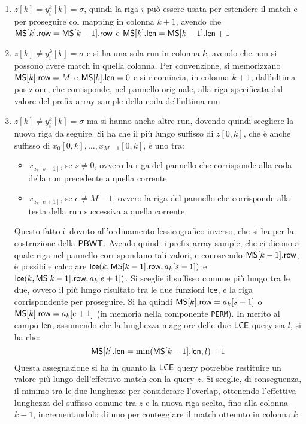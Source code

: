 \begin{enumerate}
  \item $z[k]=y_i^k[k]=\sigma$, quindi la riga $i$ può essere usata per
  estendere il 
  match e per 
  proseguire col mapping in colonna $k+1$, avendo che
  $\mbox{\rm {\sf MS}}[k].\mbox{\rm {\sf row}}=\mbox{\rm {\sf MS}}[k-1].\mbox{\rm {\sf row}}$ e $\mbox{\rm {\sf MS}}[k].\mbox{\rm {\sf len}}=\mbox{\rm {\sf MS}}[k-1].\mbox{\rm {\sf len}}+1$
  \item $z[k]\neq y_i^k[k]=\sigma$ e si ha una sola run in colonna $k$, avendo
  che 
  non si possono avere match in quella colonna. Per convenzione, si
  memorizzano $\mbox{\rm {\sf MS}}[k].\mbox{\rm {\sf row}} = M$ e $\mbox{\rm {\sf MS}}[k].\mbox{\rm {\sf len}}=0$ e si ricomincia, in
  colonna 
  $k+1$, dall'ultima posizione, che corrisponde, nel pannello originale,
  alla riga specificata dal valore del prefix array sample della coda
  dell'ultima run 
  \item $z[k]\neq y_i^k[k]=\sigma$ ma si hanno anche altre run, dovendo quindi
  scegliere 
  la nuova riga da seguire. Si ha che il più lungo suffisso di $z[0,k]$, che è
  anche suffisso di $x_0[0,k],\ldots, x_{M-1}[0,k]$, è uno tra:
  \begin{itemize}
    \item $x_{a_k[s-1]}$, se $s\neq 0$, ovvero la riga del pannello
    che corrisponde alla coda della run precedente a quella corrente
    \item $x_{a_k[e+1]}$, se $e\neq M-1$, ovvero la riga del pannello
    che corrisponde alla testa della run successiva a quella corrente
  \end{itemize}
  Questo fatto è dovuto all'ordinamento lessicografico
  inverso, che si ha per la costruzione della $\mbox{\rm {\sf PBWT}}$.
  Avendo quindi i prefix array sample, che ci dicono a quale riga nel
  pannello corrispondano tali valori, e conoscendo $\mbox{\rm {\sf MS}}[k-1].\mbox{\rm {\sf row}}$, è possibile
  calcolare $\mbox{\rm {\sf lce}}(k,\mbox{\rm {\sf MS}}[k-1].\mbox{\rm {\sf row}}, a_k[s-1])$ e $\mbox{\rm {\sf lce}}(k,\mbox{\rm {\sf MS}}[k-1].\mbox{\rm {\sf row}},
  a_k[e+1])$. Si sceglie il suffisso comune più lungo tra le due, ovvero il più
  lungo risultato tra le due funzioni $\mbox{\rm {\sf lce}}$, e la riga
  corrispondente per proseguire. Si ha quindi $\mbox{\rm {\sf MS}}[k].\mbox{\rm {\sf row}}=a_k[s-1]$ o
  $\mbox{\rm {\sf MS}}[k].\mbox{\rm {\sf row}}=a_k[e+1]$ (in memoria nella componente \texttt{PERM}). In merito
  al campo $\mbox{\rm {\sf len}}$, assumendo che la lunghezza 
  maggiore delle due $\mbox{\rm {\sf LCE}}$ query sia $l$, si ha che:
  \begin{equation}
    \label{eq:mslce1}
    \mbox{\rm {\sf MS}}[k].\mbox{\rm {\sf len}}=\min(\mbox{\rm {\sf MS}}[k-1].\mbox{\rm {\sf len}}, l)+1
  \end{equation}
  Questa assegnazione si ha in quanto la $\mbox{\rm {\sf LCE}}$ query potrebbe restituire un
  valore più lungo dell'effettivo 
  match con la query $z$. Si sceglie, di conseguenza, il minimo tra le due
  lunghezze per considerare l'overlap, 
  ottenendo l'effettiva lunghezza del suffisso comune tra $z$ e la nuova riga
  scelta, fino alla colonna $k-1$, incrementandolo di uno per conteggiare il
  match ottenuto in colonna $k$ 
\end{enumerate}
